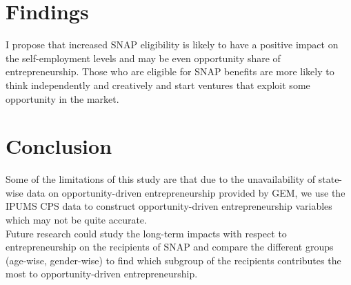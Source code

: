 \documentclass[12pt]{article}
\begin{document}
\begin{titlingpage}
\section*{Findings} 

I propose that increased SNAP eligibility is likely to have a positive impact on the self-employment levels and may be even opportunity share of entrepreneurship. Those who are eligible for SNAP benefits are more likely to think independently and creatively and start ventures that exploit some opportunity in the market. \\





\section*{Conclusion}

Some of the limitations of this study are that due to the unavailability of state-wise data on opportunity-driven entrepreneurship provided by GEM, we use the IPUMS CPS data to construct opportunity-driven entrepreneurship variables which may not be quite accurate. \\

Future research could study the long-term impacts with respect to entrepreneurship on the recipients of SNAP and compare the different groups (age-wise, gender-wise) to find which subgroup of the recipients contributes the most to opportunity-driven entrepreneurship. \\






\newpage
\printbibliography[heading=bibintoc,title={Bibliography}] 


\end{titlingpage}
\end{document}
